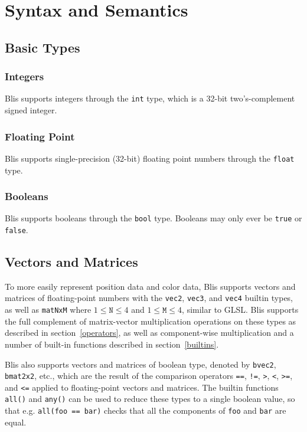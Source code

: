 \documentclass[11pt]{article}
\newcommand{\code}[1]{\texttt{#1}}
\begin{document}
\section{Syntax and Semantics}

\subsection{Basic Types}

\subsubsection{Integers}

Blis supports integers through the \code{int} type, which is a 32-bit two's-complement signed integer.

\subsubsection{Floating Point}

Blis supports single-precision (32-bit) floating point numbers through the \code{float} type.

\subsubsection{Booleans}

Blis supports booleans through the \code{bool} type. Booleans may only ever be \code{true} or \code{false}.

\subsection{Vectors and Matrices}

To more easily represent position data and color data, Blis supports vectors and matrices of floating-point numbers with the \code{vec2}, \code{vec3}, and \code{vec4} builtin types, as well as \code{matNxM} where  $1 \leq \code{N} \leq 4$ and $1 \leq \code{M} \leq 4$, similar to GLSL. Blis supports the full complement of matrix-vector multiplication operations on these types as described in section~\ref{operators}, as well as component-wise multiplication and a number of built-in functions described in section~\ref{builtins}.

Blis also supports vectors and matrices of boolean type, denoted by \code{bvec2}, \code{bmat2x2}, etc., which are the result of the comparison operators \code{==}, \code{!=}, \code{>}, \code{<}, \code{>=}, and \code{<=} applied to floating-point vectors and matrices. The builtin functions \code{all()} and \code{any()} can be used to reduce these types to a single boolean value, so that e.g. \code{all(foo == bar)} checks that all the components of \code{foo} and \code{bar} are equal.
\end{document}
